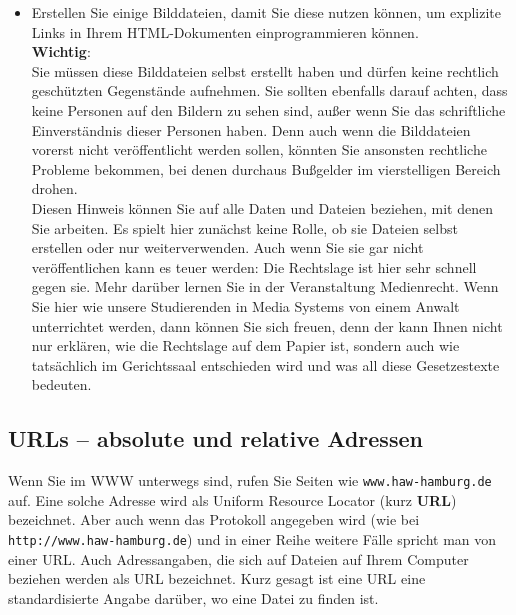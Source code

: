 \begin{itemize}
	\item Erstellen Sie einige Bilddateien, damit Sie diese nutzen können, um explizite Links in Ihrem HTML-Dokumenten einprogrammieren können.\\
	
	\textbf{Wichtig}:\\
	
	Sie müssen diese Bilddateien selbst erstellt haben und dürfen keine rechtlich geschützten Gegenstände aufnehmen. Sie sollten ebenfalls darauf achten, dass keine Personen auf den Bildern zu sehen sind, außer wenn Sie das schriftliche Einverständnis dieser Personen haben. Denn auch wenn die Bilddateien vorerst nicht veröffentlicht werden sollen, könnten Sie ansonsten rechtliche Probleme bekommen, bei denen durchaus Bußgelder im vierstelligen Bereich drohen.\\
	
	Diesen Hinweis können Sie auf alle Daten und Dateien beziehen, mit denen Sie arbeiten. Es spielt hier zunächst keine Rolle, ob sie Dateien selbst erstellen oder \glqq{}nur\grqq{} weiterverwenden. Auch wenn Sie sie gar nicht veröffentlichen kann es teuer werden: Die Rechtslage ist hier sehr schnell gegen sie. Mehr darüber lernen Sie in der Veranstaltung Medienrecht. Wenn Sie hier wie unsere Studierenden in Media Systems von einem Anwalt unterrichtet werden, dann können Sie sich freuen, denn der kann Ihnen nicht nur erklären, wie die Rechtslage auf dem Papier ist, sondern auch wie tatsächlich im Gerichtssaal entschieden wird und was all diese Gesetzestexte bedeuten.
\end{itemize}

\subsection{URLs – absolute und relative Adressen}

Wenn Sie im WWW unterwegs sind, rufen Sie Seiten wie \verb|www.haw-hamburg.de| auf. Eine solche Adresse wird als Uniform Resource Locator (kurz \textbf{URL}) bezeichnet. Aber auch wenn das Protokoll angegeben wird (wie bei \verb|http://www.haw-hamburg.de|) und in einer Reihe weitere Fälle spricht man von einer URL. Auch \glqq{}Adressangaben\grqq{}, die sich auf Dateien auf Ihrem Computer beziehen werden als URL bezeichnet. Kurz gesagt ist eine URL eine standardisierte Angabe darüber, wo eine Datei zu finden ist.\\

